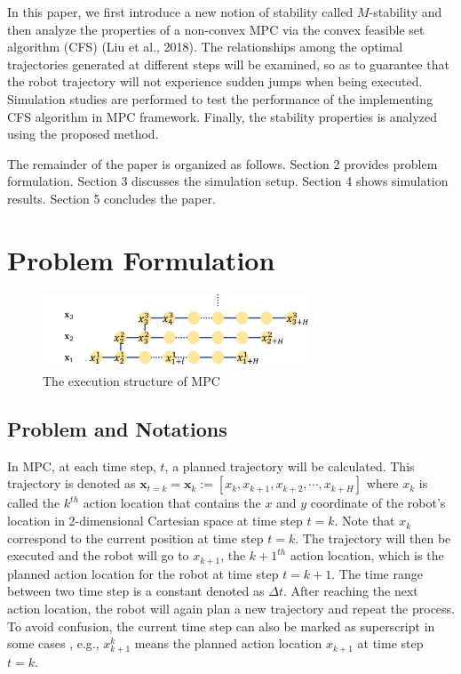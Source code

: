 \documentclass{ifacconf}
\begin{document}
In this paper, we first introduce a new notion of stability called $M$-stability and then analyze the properties of a non-convex MPC via the convex feasible set algorithm (CFS) (Liu et al., 2018).  The relationships among the optimal trajectories generated at different steps will be examined, so as to  guarantee that the robot trajectory will not experience sudden jumps when being executed. Simulation studies are performed to test the performance of the implementing CFS  algorithm in MPC framework. Finally, the stability properties is analyzed using the proposed method.

The remainder of the paper is organized as follows. Section 2 provides problem formulation. Section 3 discusses the simulation setup. Section 4 shows simulation results. Section 5 concludes the paper.

\section{Problem Formulation}

\begin{figure}[htbp]
\begin{center}
\includegraphics[width=8cm]{src/MPCstruc.png}
\caption{The execution structure of MPC}
\label{fig: mpc}
\end{center}
\end{figure}

\subsection{Problem and Notations}
In MPC, at each time step, $t$, a planned trajectory will be calculated. This trajectory is denoted as $\mathbf{x}_{t=k}=\mathbf{x}_{k} := [x_k, x_{k+1},x_{k+2},\cdots,x_{k+H}]$ where $x_k$ is called the $k^{th}$ action location that contains the $x$ and $y$ coordinate of the robot's location in 2-dimensional Cartesian space at time step $t=k$. Note that $x_k$ correspond to the current position at time step $t=k$. The trajectory will then be executed and the robot will go to $x_{k+1}$, the $k+1^{th}$ action location, which is the planned action location for the robot at time step $t=k+1$. The time range between two time step is a constant denoted as $\Delta t$. After reaching the next action location, the robot will again plan a new trajectory and repeat the process. To avoid confusion, the current time step can also be marked as superscript in some cases , e.g., $x_{k+1}^k$ means the planned action location $x_{k+1}$ at time step $t=k$.
\end{document}

